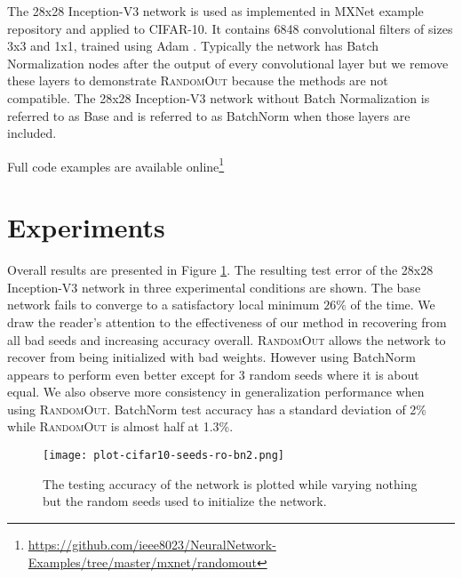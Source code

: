 \documentclass{article}
\begin{document}
The 28x28 Inception-V3 network is used as implemented in MXNet example repository \cite{chen_mxnet:_2015} \cite{szegedy_rethinking_2015} and applied to CIFAR-10. It contains 6848 convolutional filters of sizes 3x3 and 1x1, trained using Adam \cite{kingma_adam:_2014}. Typically the network has Batch Normalization nodes after the output of every convolutional layer but we remove these layers to demonstrate \textsc{RandomOut} because the methods are not compatible. The 28x28 Inception-V3 network without Batch Normalization is referred to as Base and is referred to as BatchNorm when those layers are included.

Full code examples are available online\footnote{\url{https://github.com/ieee8023/NeuralNetwork-Examples/tree/master/mxnet/randomout}}

\section{Experiments}
\label{sec:exp}

Overall results are presented in Figure \ref{fig:varyseed}. The resulting test error of the 28x28 Inception-V3 network in three experimental conditions are shown. The base network fails to converge to a satisfactory local minimum $26\%$ of the time. We draw the reader's attention to the effectiveness of our method in recovering from all bad seeds and increasing accuracy overall. \textsc{RandomOut} allows the network to recover from being initialized with bad weights. However using BatchNorm appears to perform even better except for 3 random seeds where it is about equal. We also observe more consistency in generalization performance when using \textsc{RandomOut}. BatchNorm test accuracy has a standard deviation of 2\% while \textsc{RandomOut} is almost half at 1.3\%. 

\begin{figure}
  \begin{center}
    \texttt{[image: plot-cifar10-seeds-ro-bn2.png]}
     \caption{The testing accuracy of the network is plotted while varying nothing but the random seeds used to initialize the network.}
      \label{fig:varyseed}
  \end{center}
\end{figure}
\end{document}
